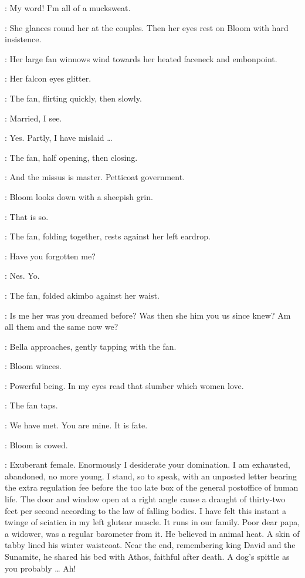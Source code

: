 \Bella:
My word!
I'm all of a mucksweat.

:
She glances round her at the couples.
Then her eyes rest on Bloom with hard insistence.

:
Her large fan winnows wind towards her heated faceneck and embonpoint.

:
Her falcon eyes glitter.

:
The fan, flirting quickly, then slowly.

\Fan:
Married, I see.

\Bloom:
Yes.
Partly, I have mislaid \ldots

:
The fan, half opening, then closing.

\Fan:
And the missus is master.
Petticoat government.%

:
Bloom looks down with a sheepish grin.

\Bloom:
That is so.

:
The fan, folding together, rests against her left eardrop.

\Fan:
Have you forgotten me?

\Bloom:
Nes. Yo.

:
The fan, folded akimbo against her waist.

\Fan:
Is me her was you dreamed before?
Was then she him you us since knew?
Am all them and the same now we?

:
Bella approaches,
gently tapping with the fan.

:
Bloom winces.

\Bloom:
Powerful being.
In my eyes read that slumber which women love.

:
The fan taps.

\Fan:
We have met.
You are mine.
It is fate.

:
Bloom is cowed.

\Bloom:
Exuberant female.
Enormously I desiderate your domination.
I am exhausted, abandoned, no more young.
I stand, so to speak, with an unposted letter
bearing the extra regulation fee
before the too late box of the general postoffice of human life.
The door and window open at a right angle
cause a draught of thirty-two feet per second
according to the law of falling bodies.
I have felt this instant a twinge of sciatica in my left glutear muscle.
It runs in our family.
Poor dear papa, a widower, was a regular barometer from it.
He believed in animal heat.
A skin of tabby lined his winter waistcoat.
Near the end, remembering king David and the Sunamite,
he shared his bed with Athos, faithful after death.
A dog's spittle as you probably \ldots
{}
Ah!

